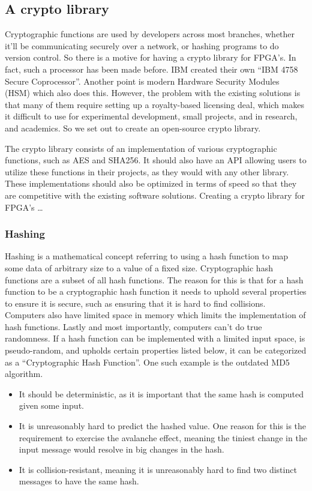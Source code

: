 \documentclass[a4paper]{article}
\begin{document}
\subsection{A crypto library}
\label{sec:org1815be4}
Cryptographic functions are used by developers across most branches, whether it'll be communicating securely over a network, or hashing programs to do version control.
So there is a motive for having a crypto library for FPGA's. In fact, such a processor has been made before. IBM created their own ``IBM 4758 Secure Coprocessor''\cite{IBM4758}. Another point is modern Hardware Security Modules (HSM) which also does this.
However, the problem with the existing solutions is that many of them require setting up a royalty-based licensing deal, which makes it difficult to use for experimental development, small projects, and in research, and academics.
So we set out to create an open-source crypto library.

The crypto library consists of an implementation of various cryptographic functions, such as AES and SHA256. It should also have an API allowing users to utilize these functions in their projects, as they would with any other library.
These implementations should also be optimized in terms of speed so that they are competitive with the existing software solutions.
Creating a crypto library for FPGA's \ldots{}
\subsubsection{Hashing}
\label{sec:org70c6b53}
Hashing is a mathematical concept referring to using a hash function to map some data of arbitrary size to a value of a fixed size. Cryptographic hash functions are a subset of all hash functions.
The reason for this is that for a hash function to be a cryptographic hash function it needs to uphold several properties to ensure it is secure, such as ensuring that it is hard to find collisions. Computers also have limited space in memory which limits the implementation of hash functions. Lastly and most importantly, computers can't do true randomness.
If a hash function can be implemented with a limited input space, is pseudo-random, and upholds certain properties listed below, it can be categorized as a ``Cryptographic Hash Function''. One such example is the outdated MD5 algorithm.
\begin{itemize}
\item It should be deterministic, as it is important that the same hash is computed given some input.
\item It is unreasonably hard to predict the hashed value. One reason for this is the requirement to exercise the avalanche effect, meaning the tiniest change in the input message would resolve in big changes in the hash.
\item It is collision-resistant, meaning it is unreasonably hard to find two distinct messages to have the same hash.
\end{itemize}
\end{document}
